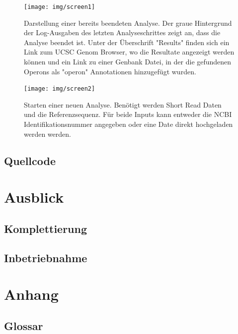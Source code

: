 \documentclass[a4paper]{thesis}
\begin{document}
\begin{figure}[h]
\texttt{[image: img/screen1]}
\label{fig:screen1}
\caption[Screenshot 1]{
	Darstellung einer bereits beendeten Analyse. Der graue Hintergrund
	der Log-Ausgaben des letzten Analyseschrittes zeigt an, dass die
	Analyse beendet ist. Unter der Überschrift "Results" finden sich
	ein Link zum UCSC Genom Browser, wo die Resultate angezeigt werden
	können und ein Link zu einer Genbank Datei, in der die gefundenen
	Operons als "operon" Annotationen hinzugefügt wurden.
}

\end{figure}
\begin{figure}[h]
\texttt{[image: img/screen2]}
\label{fig:screen2}
\caption[Screenshot 2]{
	Starten einer neuen Analyse. Benötigt werden Short Read Daten und
	die Referenzsequenz. Für beide Inputs kann entweder die NCBI
	Identifikationsnummer angegeben oder eine Date direkt
	hochgeladen werden werden.
}
\end{figure}

\subsection{Quellcode}


\paragraphmark{}

\section{Ausblick}

\subsection{Komplettierung}

\subsection{Inbetriebnahme}

\section{Anhang}

\subsection{Glossar}
\end{document}
